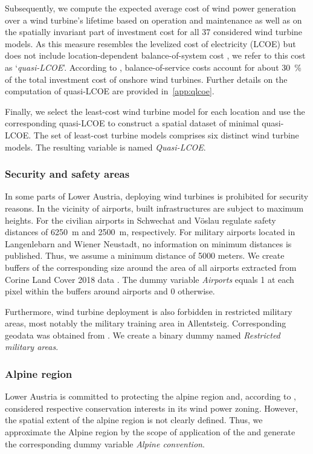 \documentclass[review, a4paper, 12pt, authoryear, times]{elsarticle}
\begin{document}
Subsequently, we compute the expected average cost of wind power generation over a wind turbine's lifetime based on operation and maintenance as well as on the spatially invariant part of investment cost for all \num{37} considered wind turbine models.
As this measure resembles the levelized cost of electricity (LCOE) but does not include location-dependent balance-of-system cost \citep{Eberle2019}, we refer to this cost as `\emph{quasi-LCOE}'.
According to \cite{Eberle2019}, balance-of-service costs account for about \SI{30}{\percent} of the total investment cost of onshore wind turbines.
Further details on the computation of quasi-LCOE are provided in~\ref{app:qlcoe}.

Finally, we select the least-cost wind turbine model for each location and use the corresponding quasi-LCOE to construct a spatial dataset of minimal quasi-LCOE.
The set of least-cost turbine models comprises six distinct wind turbine models.
The resulting variable is named \emph{Quasi-LCOE}.

\subsubsection{Security and safety areas}
In some parts of Lower Austria, deploying wind turbines is prohibited for security reasons.
In the vicinity of airports, built infrastructures are subject to maximum heights. 
For the civilian airports in Schwechat and Vöslau \cite{BMK2019, AustroControl2023a} regulate safety distances of \SI{6250}{\metre} and \SI{2500}{\metre}, respectively.
For military airports located in Langenlebarn and Wiener Neustadt, no information on minimum distances is published. 
Thus, we assume a minimum distance of \num{5000} meters. 
We create buffers of the corresponding size around the area of all airports extracted from Corine Land Cover 2018 data \citep{UBA2018b}. 
The dummy variable \emph{Airports} equals \num{1} at each pixel within the buffers around airports and \num{0} otherwise.

Furthermore, wind turbine deployment is also forbidden in restricted military areas, most notably the military training area in Allentsteig.
Corresponding geodata was obtained from \cite{AustroControl2023}.
We create a binary dummy named \emph{Restricted military areas}.

\subsubsection{Alpine region}
Lower Austria is committed to protecting the alpine region and, according to \cite{Knoll2014}, considered respective conservation interests in its wind power zoning.
However, the spatial extent of the alpine region is not clearly defined. 
Thus, we approximate the Alpine region by the scope of application of the \cite{AlpineConvention2020} and generate the corresponding dummy variable \emph{Alpine convention}.
\end{document}
